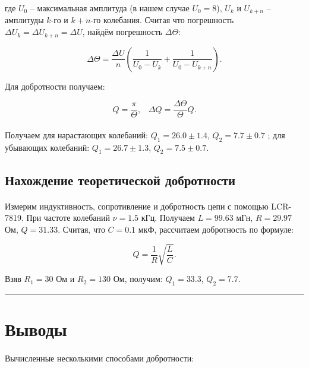 \documentclass[a4paper,12pt]{article} %
\begin{document}
\noindent где $U_0$ -- максимальная амплитуда (в нашем случае $U_0 = 8$), $U_k$ и  $U_{k+n}$ -- амплитуды $k$-го и $k+n$-го колебания. Считая что погрешность $\Delta U_k = \Delta U_{k + n} = \Delta U$, найдём погрешность $\Delta \Theta$:

\[ \Delta \Theta = \frac{\Delta U}{n} \left( \frac{1}{U_0 - U_k} + \frac{1}{U_0 - U_{k+n}} \right).
\]

\noindent Для добротности получаем:

\[ Q = \frac{\pi}{\Theta}, \;\;\; \Delta Q = \frac{\Delta \Theta}{\Theta} Q. 
\]

\paragraph{} Получаем для нарастающих колебаний: $Q_1 = 26.0 \pm 1.4$, $Q_2 = 7.7 \pm 0.7$ ; для убывающих колебаний: $Q_1 = 26.7 \pm 1.3$, $Q_2 = 7.5 \pm 0.7$.

\subsection{Нахождение теоретической добротности}

\paragraph{} Измерим индуктивность, сопротивление и добротность цепи с помощью LCR-7819. При частоте колебаний $\nu = 1.5$ кГц. Получаем $L = 99.63$ мГн, $R = 29.97$ Ом, $Q = 31.33$. Считая, что $C = 0.1$ мкФ, рассчитаем добротность по формуле:

\[ Q = \frac{1}{R} \sqrt{\frac{L}{C}}.
\]

\noindent Взяв $R_1 = 30$ Ом и $R_2 = 130$ Ом, получим: $Q_1 = 33.3$, $Q_2 = 7.7$.


\medskip\hrule\medskip

\section{Выводы}

\paragraph{} Вычисленные несколькими способами добротности:
\end{document}
